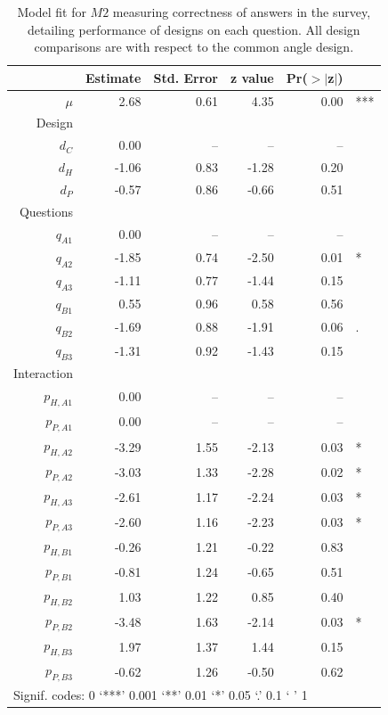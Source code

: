 \begin{table}[ht]
\begin{center}
\begin{tabular}{rrrrrl}
  \hline
 & Estimate & Std. Error & z value & Pr($>$$|$z$|$) & \\ 
  \hline  
$\mu$ & 2.68 & 0.61 & 4.35 & 0.00  & ***\\ [5pt]
Design\\
  $d_C$ & 0.00 & -- & -- & -- \\ 
  $d_H$ & -1.06 & 0.83 & -1.28 & 0.20  \\ 
  $d_P$ & -0.57 & 0.86 & -0.66 & 0.51 \\ [5pt]
Questions\\
  $q_{A1}$ & 0.00 & -- & -- & -- \\ 
  $q_{A2}$  & -1.85 & 0.74 & -2.50 & 0.01 &* \\ 
  $q_{A3}$  & -1.11 & 0.77 & -1.44 & 0.15 \\ 
  $q_{B1}$ & 0.55 & 0.96 & 0.58 & 0.56 \\ 
  $q_{B2}$  & -1.69 & 0.88 & -1.91 & 0.06 &. \\ 
  $q_{B3}$  & -1.31 & 0.92 & -1.43 & 0.15 \\ [5pt]
 
Interaction \\
$p_{H, A1}$ &  0.00 & -- & -- & -- \\
$p_{P,A1}$ &  0.00 & -- & -- & -- \\
$p_{H, A2}$ &  -3.29 & 1.55 & -2.13 & 0.03 & *\\ 
$p_{P,A2}$ & -3.03 & 1.33 & -2.28 & 0.02 &*\\ 
$p_{H,A3}$ &-2.61 & 1.17 & -2.24 & 0.03  & * \\ 
$p_{P,A3}$ & -2.60 & 1.16 & -2.23 & 0.03 &*\\ 
$p_{H,B1}$ &-0.26 & 1.21 & -0.22 & 0.83 \\ 
$p_{P,B1}$ &-0.81 & 1.24 & -0.65 & 0.51 \\ 
$p_{H,B2}$ & 1.03 & 1.22 & 0.85 & 0.40 \\ 
$p_{P,B2}$  & -3.48 & 1.63 & -2.14 & 0.03 &*\\ 
$p_{H,B3}$ & 1.97 & 1.37 & 1.44 & 0.15 \\ 
$p_{P,B3}$ & -0.62 & 1.26 & -0.50 & 0.62 \\   
   \hline
\multicolumn{6}{l}{Signif. codes:  0 `***' 0.001 `**' 0.01 `*' 0.05 `.' 0.1 ` ' 1 }
\end{tabular}
\end{center}
\caption{\label{model2} Model fit for $M2$ measuring correctness of answers in the survey, detailing performance of designs on each question. All design comparisons are with respect to the common angle design. }
\end{table}



